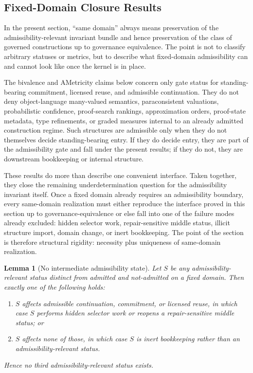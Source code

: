 \documentclass[11pt]{article}
\newtheorem{lemma}[theorem]{Lemma}
\theoremstyle{definition}
\theoremstyle{remark}
\begin{document}
\subsection{Fixed-Domain Closure Results}

In the present section, ``same domain'' always means preservation of the admissibility-relevant invariant bundle and hence preservation of the class of governed constructions up to governance equivalence. The point is not to classify arbitrary statuses or metrics, but to describe what fixed-domain admissibility can and cannot look like once the kernel is in place.

The bivalence and AMetricity claims below concern only gate status for standing-bearing commitment, licensed reuse, and admissible continuation. They do not deny object-language many-valued semantics, paraconsistent valuations, probabilistic confidence, proof-search rankings, approximation orders, proof-state metadata, type refinements, or graded measures internal to an already admitted construction regime. Such structures are admissible only when they do not themselves decide standing-bearing entry. If they do decide entry, they are part of the admissibility gate and fall under the present results; if they do not, they are downstream bookkeeping or internal structure.

These results do more than describe one convenient interface. Taken together, they close the remaining underdetermination question for the admissibility invariant itself. Once a fixed domain already requires an admissibility boundary, every same-domain realization must either reproduce the interface proved in this section up to governance-equivalence or else fall into one of the failure modes already excluded: hidden selector work, repair-sensitive middle status, illicit structure import, domain change, or inert bookkeeping. The point of the section is therefore structural rigidity: necessity plus uniqueness of same-domain realization.

\begin{lemma}[No intermediate admissibility state]\label{lem:no-intermediate-status}
Let $S$ be any admissibility-relevant status distinct from admitted and not-admitted on a fixed domain. Then exactly one of the following holds:
\begin{enumerate}[label=(\roman*)]
\item $S$ affects admissible continuation, commitment, or licensed reuse, in which case $S$ performs hidden selector work or reopens a repair-sensitive middle status; or
\item $S$ affects none of those, in which case $S$ is inert bookkeeping rather than an admissibility-relevant status.
\end{enumerate}
Hence no third admissibility-relevant status exists.
\end{lemma}
\end{document}
